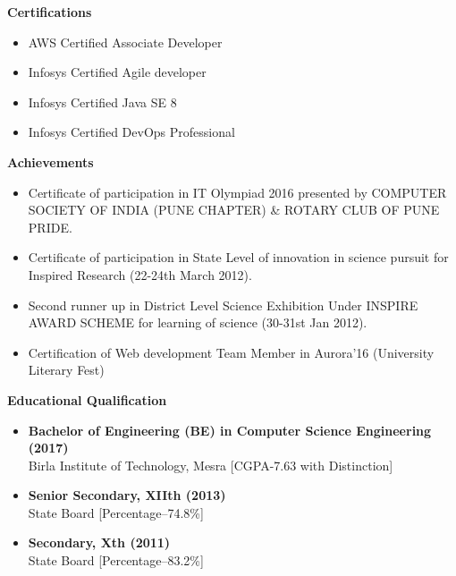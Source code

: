 \documentclass[a4paper,10pt]{article}
\newcommand{\resitem}[1]{\item #1}
\newcommand{\resheading}[1]{\vspace{0.5em} {\small \colorbox{mygrey}{{\begin{minipage}{0.975\textwidth}{{\textbf{#1}}}\end{minipage}}}} \vspace{0.5em}}
\begin{document}
\resheading{Certifications}
\begin{itemize}[nosep]
    \resitem{AWS Certified Associate Developer}
    \resitem{Infosys Certified Agile developer}
    \resitem{Infosys Certified Java SE 8}
    \resitem{Infosys Certified DevOps Professional}
\end{itemize}

\resheading{Achievements}
\begin{itemize}[nosep]
    \resitem{Certificate of participation in IT Olympiad 2016 presented by COMPUTER SOCIETY OF INDIA (PUNE CHAPTER) & ROTARY CLUB OF PUNE PRIDE.}
    \resitem{Certificate of participation in State Level of innovation in science pursuit for Inspired Research (22-24th March 2012).}
    \resitem{Second runner up in District Level Science Exhibition Under INSPIRE AWARD SCHEME for learning of science (30-31st Jan 2012).}
    \resitem{Certification of Web development Team Member in Aurora’16 (University Literary Fest)}
\end{itemize}

\resheading{Educational Qualification}
\begin{itemize}[nosep]
    \resitem{\textbf{Bachelor of Engineering (BE) in Computer Science Engineering (2017)} \\ Birla Institute of Technology, Mesra [CGPA-7.63 with Distinction]}
    \resitem{\textbf{Senior Secondary, XIIth (2013)} \\ State Board [Percentage–74.8\%]}
    \resitem{\textbf{Secondary, Xth (2011)} \\ State Board [Percentage–83.2\%]}
\end{itemize}
\end{document}
